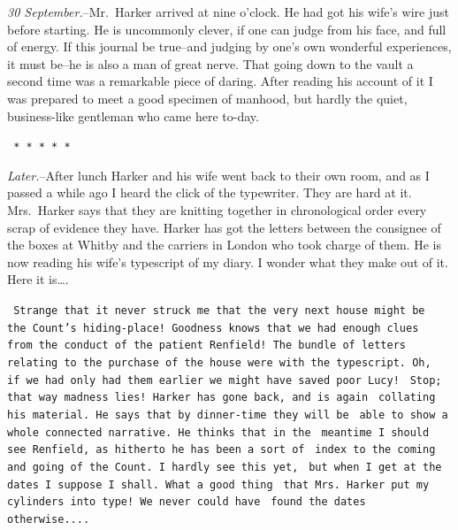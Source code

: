 \documentclass[12pt,openright]{book}
\begin{document}
\textit{30 September.}–Mr. Harker arrived at nine o’clock. He had got his wife’s wire just before starting. He is uncommonly clever, if one can judge from his face, and full of energy. If this journal be true–and judging by one’s own wonderful experiences, it must be–he is also a man of great nerve. That going down to the vault a second time was a remarkable piece of daring. After reading his account of it I was prepared to meet a good specimen of manhood, but hardly the quiet, business-like gentleman who came here to-day.

\texttt{   *       *       *       *       *}

\textit{Later.}–After lunch Harker and his wife went back to their own room, and as I passed a while ago I heard the click of the typewriter. They are hard at it. Mrs. Harker says that they are knitting together in chronological order every scrap of evidence they have. Harker has got the letters between the consignee of the boxes at Whitby and the carriers in London who took charge of them. He is now reading his wife’s typescript of my diary. I wonder what they make out of it. Here it is….

\texttt{ Strange that it never struck me that the very next house might be}
\texttt{ the Count’s hiding-place! Goodness knows that we had enough clues}
\texttt{ from the conduct of the patient Renfield! The bundle of letters}
\texttt{ relating to the purchase of the house were with the typescript. Oh,}
\texttt{ if we had only had them earlier we might have saved poor Lucy!}
\texttt{ Stop; that way madness lies! Harker has gone back, and is again}
\texttt{ collating his material. He says that by dinner-time they will be}
\texttt{ able to show a whole connected narrative. He thinks that in the}
\texttt{ meantime I should see Renfield, as hitherto he has been a sort of}
\texttt{ index to the coming and going of the Count. I hardly see this yet,}
\texttt{ but when I get at the dates I suppose I shall. What a good thing}
\texttt{ that Mrs. Harker put my cylinders into type! We never could have}
\texttt{ found the dates otherwise....}
\end{document}
